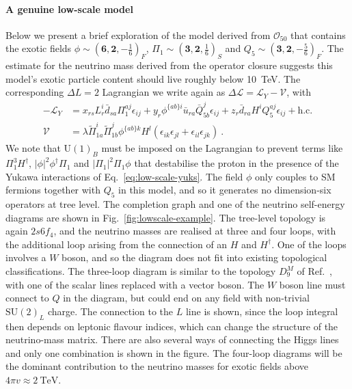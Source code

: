 \paragraph{A genuine low-scale model} Below we present a brief exploration of
the model derived from $\mathcal{O}_{50}$ that contains the exotic fields
$\phi \sim (\mathbf{6}, \mathbf{2}, -\tfrac{1}{6})_{F}$,
$\Pi_{1} \sim (\mathbf{3}, \mathbf{2}, \tfrac{1}{6})_{S}$ and
$Q_{5} \sim (\mathbf{3}, \mathbf{2}, -\tfrac{5}{6})_{F}$. The estimate for the
neutrino mass derived from the operator closure suggests this model's exotic
particle content should live roughly below \SI{10}{\TeV}. The corresponding
$\Delta L = 2$ Lagrangian we write again as
$\Delta \mathscr{L} = \mathscr{L}_{Y} - \mathcal{V}$, with
\begin{align}
  -\mathscr{L}_{Y} &= x_{rs} L^{i}_{r} \bar{d}_{sa} \Pi_{1}^{aj} \epsilon_{ij} + y_{r} \phi^{\{ab\}i} \bar{u}_{ra} \bar{Q}^{j}_{5 b} \epsilon_{ij} + z_{r} \bar{d}_{ra} H^{i} Q^{aj}_{5} \epsilon_{ij} + \text{h.c.} \label{eq:low-scale-yuks} \\
  \mathcal{V} &= \lambda \tilde{\Pi}_{1a}^{i} \tilde{\Pi}_{1b}^{j} \phi^{\{ab\}k} H^{l} (\epsilon_{ik}\epsilon_{jl} + \epsilon_{il}\epsilon_{jk}) \ .
\end{align}
We note that $\mathrm{U}(1)_{B}$ must be imposed on the Lagrangian to prevent
terms like $\Pi^{3}_{1} H^{\dagger}$, $|\phi|^{2}\phi^{\dagger}\Pi_{1}$ and
$|\Pi_{1}|^{2} \Pi_{1} \phi$ that destabilise the proton in the presence of the
Yukawa interactions of Eq.~\eqref{eq:low-scale-yuks}. The field $\phi$ only
couples to SM fermions together with $Q_{5}$ in this model, and so it generates
no dimension-six operators at tree level. The completion graph and one of the
neutrino self-energy diagrams are shown in Fig.~\ref{fig:lowscale-example}. The
tree-level topology is again $2s6f_{4}$, and the neutrino masses are realised at
three and four loops, with the additional loop arising from the connection of an
$H$ and $H^{\dagger}$. One of the loops involves a $W$ boson, and so the diagram
does not fit into existing topological classifications. The three-loop diagram
is similar to the topology $D_{9}^{M}$ of Ref.~\cite{Cepedello:2018rfh}, with
one of the scalar lines replaced with a vector boson. The $W$ boson line must
connect to $Q$ in the diagram, but could end on any field with non-trivial
$\mathrm{SU}(2)_{L}$ charge. The connection to the $L$ line is shown, since the
loop integral then depends on leptonic flavour indices, which can change the
structure of the neutrino-mass matrix. There are also several ways of connecting
the Higgs lines and only one combination is shown in the figure. The four-loop
diagrams will be the dominant contribution to the neutrino masses for exotic
fields above $4 \pi v \approx \SI{2}{\TeV}$.

